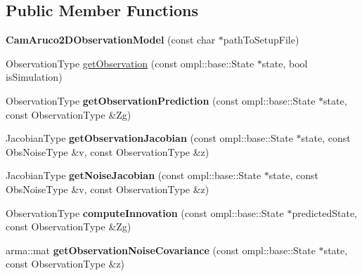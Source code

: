 \subsection*{\-Public \-Member \-Functions}
\begin{DoxyCompactItemize}
\item 
\hypertarget{class_cam_aruco2_d_observation_model_aedf847cd06f4f836797f5dbe9f99fca2}{{\bfseries \-Cam\-Aruco2\-D\-Observation\-Model} (const char $\ast$path\-To\-Setup\-File)}\label{class_cam_aruco2_d_observation_model_aedf847cd06f4f836797f5dbe9f99fca2}

\item 
\-Observation\-Type \hyperlink{class_cam_aruco2_d_observation_model_a244fd43dca1734b68bf1379b2be285d2}{get\-Observation} (const ompl\-::base\-::\-State $\ast$state, bool is\-Simulation)
\item 
\hypertarget{class_cam_aruco2_d_observation_model_a0c1869cfc821819f3fd014a9acb45a77}{\-Observation\-Type {\bfseries get\-Observation\-Prediction} (const ompl\-::base\-::\-State $\ast$state, const \-Observation\-Type \&\-Zg)}\label{class_cam_aruco2_d_observation_model_a0c1869cfc821819f3fd014a9acb45a77}

\item 
\hypertarget{class_cam_aruco2_d_observation_model_a820641c18621356b468d6646e9c35111}{\-Jacobian\-Type {\bfseries get\-Observation\-Jacobian} (const ompl\-::base\-::\-State $\ast$state, const \-Obs\-Noise\-Type \&v, const \-Observation\-Type \&z)}\label{class_cam_aruco2_d_observation_model_a820641c18621356b468d6646e9c35111}

\item 
\hypertarget{class_cam_aruco2_d_observation_model_ac1452891ef75d5dde2cf05ee628aa2fb}{\-Jacobian\-Type {\bfseries get\-Noise\-Jacobian} (const ompl\-::base\-::\-State $\ast$state, const \-Obs\-Noise\-Type \&v, const \-Observation\-Type \&z)}\label{class_cam_aruco2_d_observation_model_ac1452891ef75d5dde2cf05ee628aa2fb}

\item 
\hypertarget{class_cam_aruco2_d_observation_model_a61876ff06e81a6fd556f06ef562e3b3c}{\-Observation\-Type {\bfseries compute\-Innovation} (const ompl\-::base\-::\-State $\ast$predicted\-State, const \-Observation\-Type \&\-Zg)}\label{class_cam_aruco2_d_observation_model_a61876ff06e81a6fd556f06ef562e3b3c}

\item 
\hypertarget{class_cam_aruco2_d_observation_model_a32074e56674e8089dbcce9cf603af398}{arma\-::mat {\bfseries get\-Observation\-Noise\-Covariance} (const ompl\-::base\-::\-State $\ast$state, const \-Observation\-Type \&z)}\label{class_cam_aruco2_d_observation_model_a32074e56674e8089dbcce9cf603af398}


\end{DoxyCompactItemize}
